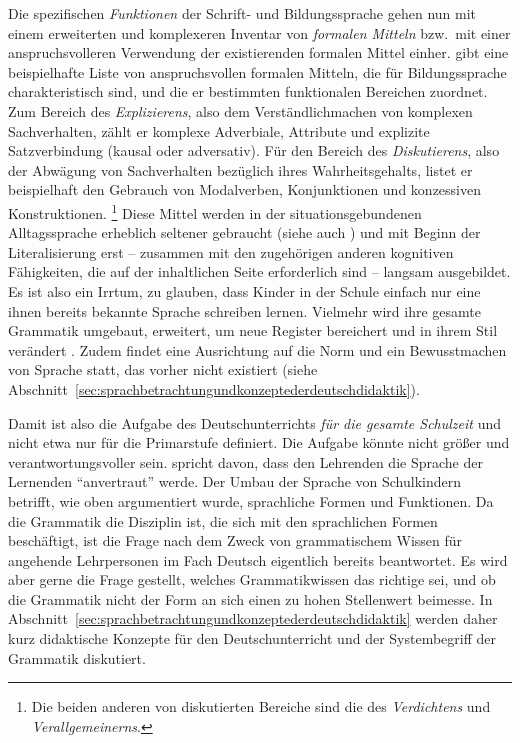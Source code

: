 Die spezifischen \textit{Funktionen} der Schrift- und Bildungssprache gehen nun mit einem erweiterten und komplexeren Inventar von \textit{formalen Mitteln} bzw.\ mit einer anspruchsvolleren Verwendung der existierenden formalen Mittel einher.
\citet[8--9]{Feilke2012} gibt eine beispielhafte Liste von anspruchsvollen formalen Mitteln, die für Bildungssprache charakteristisch sind, und die er bestimmten funktionalen Bereichen zuordnet.
Zum Bereich des \textit{Explizierens}, also dem Verständlichmachen von komplexen Sachverhalten, zählt er komplexe Adverbiale, Attribute und explizite Satzverbindung (\zB kausal oder adversativ).
Für den Bereich des \textit{Diskutierens}, also der Abwägung von Sachverhalten bezüglich ihres Wahrheitsgehalts, listet er beispielhaft den Gebrauch von Modalverben, Konjunktionen und konzessiven Konstruktionen.%
\footnote{Die beiden anderen von \citet[8--9]{Feilke2012} diskutierten Bereiche sind die des \textit{Verdichtens} und \textit{Verallgemeinerns}.}
Diese Mittel werden in der situationsgebundenen Alltagssprache erheblich seltener gebraucht (siehe auch \citealt[82--83]{Portmanntselikas2011}) und mit Beginn der Literalisierung erst -- zusammen mit den zugehörigen anderen kognitiven Fähigkeiten, die auf der inhaltlichen Seite erforderlich sind -- langsam ausgebildet.
Es ist also ein Irrtum, zu glauben, dass Kinder in der Schule einfach nur eine ihnen bereits bekannte Sprache schreiben lernen.
Vielmehr wird ihre gesamte Grammatik umgebaut, erweitert, um neue Register bereichert und in ihrem Stil verändert \citep[4,12--15]{Eisenberg2004}.
Zudem findet eine Ausrichtung auf die Norm und ein Bewusstmachen von Sprache statt, das vorher nicht existiert (siehe Abschnitt~\ref{sec:sprachbetrachtungundkonzeptederdeutschdidaktik}).

Damit ist also die Aufgabe des Deutschunterrichts \textit{für die gesamte Schulzeit} und nicht etwa nur für die Primarstufe definiert.
Die Aufgabe könnte nicht größer und verantwortungsvoller sein.
\citet[7]{Eisenberg2013c} spricht davon, dass den Lehrenden die Sprache der Lernenden "`anvertraut"' werde.
Der Umbau der Sprache von Schulkindern betrifft, wie oben argumentiert wurde, sprachliche Formen und Funktionen.
Da die Grammatik die Disziplin ist, die sich mit den sprachlichen Formen beschäftigt, ist die Frage nach dem Zweck von grammatischem Wissen für angehende Lehrpersonen im Fach Deutsch eigentlich bereits beantwortet.
Es wird aber gerne die Frage gestellt, welches Grammatikwissen das richtige sei, und ob die Grammatik nicht der Form an sich einen zu hohen Stellenwert beimesse.
In Abschnitt~\ref{sec:sprachbetrachtungundkonzeptederdeutschdidaktik} werden daher kurz didaktische Konzepte für den Deutschunterricht und der Systembegriff der Grammatik diskutiert.


